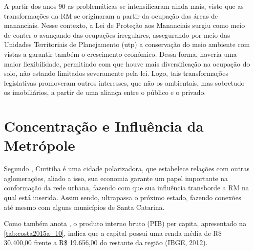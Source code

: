 	A partir dos anos 90 as problemáticas se intensificaram ainda mais, visto que as transformações da RM se originaram a partir da ocupação das áreas de mananciais. Nesse contexto, a Lei de Proteção aos Mananciais surgiu como meio de conter o avançando das ocupações irregulares, assegurando por meio das Unidades Territoriais de Planejamento (\gls{utp}) a conservação do meio ambiente com vistas a garantir também o crescimento econômico. Dessa forma, haveria uma maior flexibilidade, permitindo com que houve mais diversificação na ocupação do solo, não estando limitados severamente pela lei. Logo, tais transformações legislativas promoveram outros interesses, que não os ambientais, mas sobretudo os imobiliários, a partir de uma aliança entre o público e o privado.
	

	\section{Concentração e Influência da Metrópole}
		
	Segundo , Curitiba é uma cidade polarizadora, que estabelece relações com outras aglomerações, aliado a isso, sua economia garante um papel importante na conformação da rede urbana, fazendo com que sua influência transborde a RM na qual está inserida. Assim sendo, ultrapassa o próximo estado, fazendo conexões até mesmo com alguns municípios de Santa Catarina. 
	
	Como também anota , o produto interno bruto (PIB) per capita, apresentado na \autoref{tab:costa2015a_10}, indica que a capital possui uma renda média de R\$ 30.400,00 frente a R\$ 19.656,00 do restante da região (IBGE, 2012).
	
